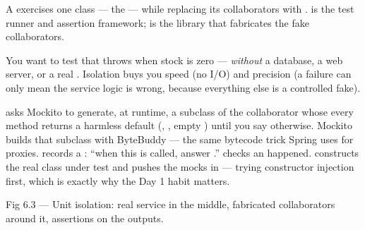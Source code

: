 
 A  exercises one class --- the  --- while replacing its collaborators with .  is the test runner and assertion framework;  is the library that fabricates the fake collaborators.

 You want to test that  throws  when stock is zero --- \emph{without} a database, a web server, or a real . Isolation buys you speed (no I/O) and precision (a failure can only mean the service logic is wrong, because everything else is a controlled fake).

  asks Mockito to generate, at runtime, a subclass of the collaborator whose every method returns a harmless default (, , empty ) until you say otherwise. Mockito builds that subclass with ByteBuddy --- the same bytecode trick Spring uses for proxies.  records a : ``when this is called, answer .''  checks an  happened.  constructs the real class under test and pushes the mocks in --- trying constructor injection first, which is exactly why the Day 1 habit matters.

\begin{wbfigure}{Fig 6.3 --- Unit isolation: real service in the middle, fabricated collaborators around it, assertions on the outputs.}
\end{wbfigure}

